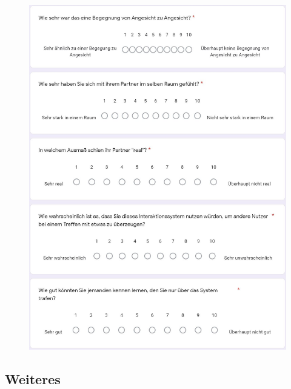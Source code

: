 \documentclass[a4paper,11pt]{article}%
\renewcommand{\\}{\vspace*{0.5\baselineskip} \newline}
\begin{document}
	\begin{figure}[H]
	\centering
		\begin{footnotesize}
			\includegraphics[scale=0.6]{Abbildungen/Fragebogen/Post-Questionnaire/PQCP6}
		\end{footnotesize}
	\end{figure}	

\subsection{Weiteres}	
	
\end{document}
